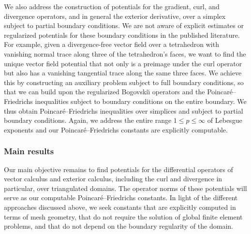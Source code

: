 \documentclass[10pt,a4paper]{article}
\begin{document}
We also address the construction of potentials for the gradient, curl, and divergence operators, and in general the exterior derivative, over a simplex subject to partial boundary conditions.
We are not aware of explicit estimates or regularized potentials for these boundary conditions in the published literature.
For example, given a divergence-free vector field over a tetrahedron with vanishing normal trace along three of the tetrahedron's faces,
we want to find the unique vector field potential that not only is a preimage under the curl operator but also has a vanishing tangential trace along the same three faces.
We achieve this by constructing an auxiliary problem subject to full boundary conditions,
so that we can build upon the regularized Bogovski\u{\i} operators and the Poincar\'e--Friedrichs inequalities subject to boundary conditions on the entire boundary.
We thus obtain Poincar\'e--Friedrichs inequalities over simplices and subject to partial boundary conditions.
Again, we address the entire range $1 \leq p \leq \infty$ of Lebesgue exponents and our Poincar\'e--Friedrichs constants are explicitly computable.





\subsubsection{Main results}



Our main objective remains to find potentials for the differential operators of vector calculus and exterior calculus, including the curl and divergence in particular, over triangulated domains.
The operator norms of these potentials will serve as our computable Poincar\'e--Friedrichs constants.
In light of the different approaches discussed above,
we seek constants that are explicitly computed in terms of mesh geometry, that do not require the solution of global finite element problems,
and that do not depend on the boundary regularity of the domain.

\end{document}
